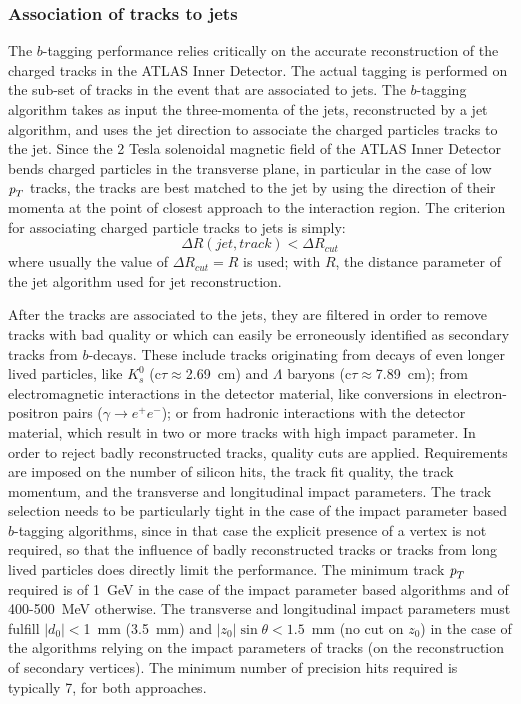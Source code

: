 \subsubsection{Association of tracks to jets}

The $b$-tagging performance relies critically on the accurate reconstruction of the charged tracks in the ATLAS Inner Detector.  The actual tagging is performed on the sub-set of tracks in the event that are associated to jets.  The $b$-tagging algorithm takes as input the three-momenta of the jets, reconstructed by a jet algorithm, and uses the jet direction to associate the charged particles tracks to the jet. Since the 2 Tesla solenoidal magnetic field of the ATLAS Inner Detector bends charged particles in the transverse plane, in particular in the case of low ${\emph{p}_{T}}$ tracks, the tracks are best matched to the jet by using the direction of their momenta at the point of closest approach to the interaction region.  The criterion for associating charged particle tracks to jets is simply:
%
\begin{equation}
\Delta R(jet, track) < \Delta R_{cut}
\end{equation}
%
where usually the value of $\Delta R_{cut} = R$ is used; with $R$, the distance parameter of the jet algorithm used for jet reconstruction.

After the tracks are associated to the jets, they are filtered in order to remove tracks with bad quality or which can easily be erroneously identified as secondary tracks from $b$-decays. These include tracks originating from decays of even longer lived particles, like $K^0_s$ (c$\tau \approx$2.69~cm) and $\Lambda$ baryons (c$\tau \approx$7.89~cm); from electromagnetic interactions in the detector material, like conversions in electron-positron pairs ($\gamma \rightarrow e^+ e^-$); or from hadronic interactions with the detector material, which result in two or more tracks with high impact parameter. 
In order to reject badly reconstructed tracks, quality cuts are applied. Requirements are imposed on the number of silicon hits, the track fit quality,  the track momentum, and the transverse and longitudinal impact parameters. The track selection needs to be particularly tight in the case of the impact parameter based $b$-tagging algorithms, since in that case the explicit presence of a vertex is not required, so that the influence of badly reconstructed tracks or tracks from long lived particles does directly limit the performance. The minimum track ${\emph{p}_{T}}$ required is of 1~GeV in the case of the impact parameter based algorithms and of 400-500~MeV otherwise. The transverse and longitudinal
impact parameters must fulfill  $|d_0|<$1~mm (3.5~mm) and $|z_0| \sin \theta < 1.5$~mm (no cut on $z_0$) in the case of the algorithms relying on the impact parameters of tracks (on the reconstruction of secondary vertices).  The minimum number of precision hits required is typically 7, for both approaches. 





